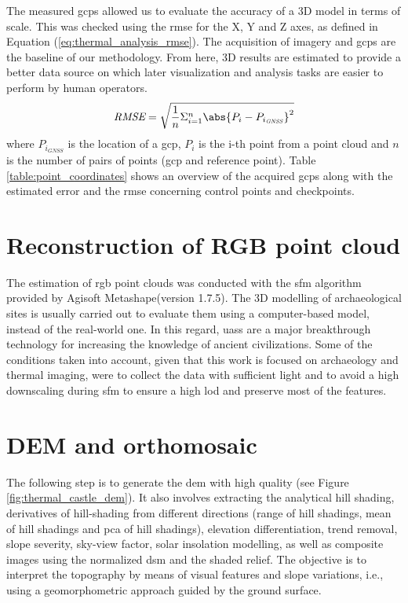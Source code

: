 The measured \acrshort{gcp}s allowed us to evaluate the accuracy of a 3D model in terms of scale. This was checked using the \acrshort{rmse} for the X, Y and Z axes, as defined in Equation (\ref{eq:thermal_analysis_rmse}). The acquisition of imagery and \acrshort{gcp}s are the baseline of our methodology. From here, 3D results are estimated to provide a better data source on which later visualization and analysis tasks are easier to perform by human operators.
\begin{equation}
\label{eq:thermal_analysis_rmse}
\textit{RMSE} = \sqrt{\frac{1}{n}\Sigma_{i=1}^{n}{\abs{P_{i} - P_{{i_{\textit{GNSS}}}}}^2}}
\end{equation}
where $P_{i_{\textit{GNSS}}}$ is the location of a \acrshort{gcp}, $P_{i}$ is the i-th point from a point cloud and $n$ is the number of pairs of points (\acrshort{gcp} and reference point). Table \ref{table:point_coordinates} shows an overview of the acquired \acrshort{gcp}s along with the estimated error and the \acrshort{rmse} concerning control points and checkpoints.

\section{Reconstruction of RGB point cloud}

The estimation of \acrshort{rgb} point clouds was conducted with the \acrshort{sfm} algorithm provided by Agisoft Metashape\textregistered (version 1.7.5). The 3D modelling of archaeological sites is usually carried out to evaluate them using a computer-based model, instead of the real-world one. In this regard, \acrshort{uas}s are a major breakthrough technology for increasing the knowledge of ancient civilizations. Some of the conditions taken into account, given that this work is focused on archaeology and thermal imaging, were to collect the data with sufficient light and to avoid a high downscaling during \acrshort{sfm} to ensure a high \acrshort{lod} and preserve most of the features.

\section{DEM and orthomosaic}

The following step is to generate the \acrshort{dem} with high quality (see Figure \ref{fig:thermal_castle_dem}). It also involves extracting the analytical hill shading, derivatives of hill-shading from different directions (range of hill shadings, mean of hill shadings and \acrshort{pca} of hill shadings), elevation differentiation, trend removal, slope severity, sky-view factor, solar insolation modelling, as well as composite images using the normalized \acrshort{dsm} and the shaded relief. The objective is to interpret the topography by means of visual features and slope variations, i.e., using a geomorphometric approach guided by the ground surface. 

